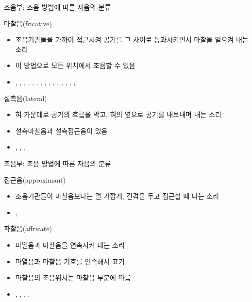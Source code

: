 \documentclass[11pt, aspectratio=169]{beamer}
\newcommand{\textds}[1]{{\ipafont #1}}
\begin{document}
\begin{frame}[t]{조음부: 조음 방법에 따른 자음의 분류}
    \begin{block}{마찰음(fricative)}
        \begin{itemize}
            \item 조음기관들을 가까이 접근시켜 공기를 그 사이로 통과시키면서 마찰을 일으켜 내는 소리
            \item 이 방법으로 모든 위치에서 조음할 수 있음
            \item \textds{[ɸ]}, \textds{[β]}, \textds{[f]}, \textds{[v]}, \textds{[θ]}, \textds{[ð]}, \textds{[s]}, \textds{[ʃ]}, \textds{[ʒ]}, \textds{[ɕ]}, \textds{[ʑ]}, \textds{[ʂ]}, \textds{[ʐ]}, \textds{[x]}, \textds{[ɣ]}, \textds{[h]}
        \end{itemize}
    \end{block}
    \begin{block}{설측음(lateral)}
        \begin{itemize}
            \item 혀 가운데로 공기의 흐름을 막고, 혀의 옆으로 공기를 내보내며 내는 소리
            \item 설측마찰음과 설측접근음이 있음
            \item \textds{[ɬ]}, \textds{[ɮ]}, \textds{[l]}, \textds{[ʎ]}
        \end{itemize}
    \end{block}

\end{frame}

\begin{frame}[t]{조음부: 조음 방법에 따른 자음의 분류}
    \begin{block}{접근음(approximant)}
        \begin{itemize}
            \item 조음기관들이 마찰음보다는 덜 가깝게, 간격을 두고 접근할 때 나는 소리
            \item \textds{[ɹ]}, \textds{[j]}
        \end{itemize}
    \end{block}
    \begin{block}{파찰음(affricate)}
        \begin{itemize}
            \item 파열음과 마찰음을 연속시켜 내는 소리
            \item 파열음과 마찰음 기호를 연속해서 표기
            \item 파찰음의 조음위치는 마찰음 부분에 따름
            \item \textds{[t͡s]}, \textds{[d͡z]} \textds{[t͡ʃ]}, \textds{[d͡ʒ]}, \textds{[t͡ɕ]}, \textds{[d͡ʑ]}
        \end{itemize}
    \end{block}
\end{frame}
\end{document}

